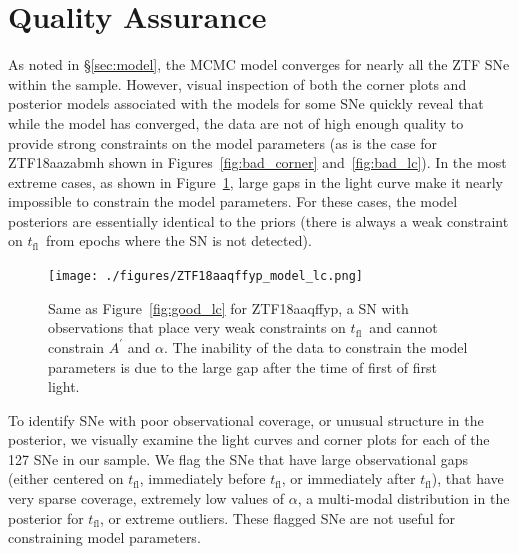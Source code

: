 \documentclass[twocolumn]{aastex63}
\newcommand{\tfl}{$t_\mathrm{fl}$}
\begin{document}

\appendix

\section{Quality Assurance \label{sec:qa}}

As noted in \S\ref{sec:model}, the MCMC model converges for nearly all the
ZTF SNe within the sample. However, visual inspection of both the corner
plots and posterior models associated with the models for some SNe quickly
reveal that while the model has converged, the data are not of high enough
quality to provide strong constraints on the model parameters (as is the case
for ZTF18aazabmh shown in Figures~\ref{fig:bad_corner} and~\ref{fig:bad_lc}).
In the most extreme cases, as shown in Figure~\ref{fig:biggap_lc}, large gaps
in the light curve make it nearly impossible to constrain the model
parameters. For these cases, the model posteriors are essentially identical
to the priors (there is always a weak constraint on \tfl\ from epochs where
the SN is not detected).

\begin{figure}
    \centering
    \texttt{[image: ./figures/ZTF18aaqffyp\_model\_lc.png]}
    \caption{Same as Figure~\ref{fig:good_lc} for ZTF18aaqffyp, a SN with observations that place very weak constraints on \tfl\ and cannot constrain $A^\prime$ and $\alpha$. The inability of the data to constrain the model parameters is due to the large gap after the time of first of first light.}
    \label{fig:biggap_lc}
\end{figure}

To identify SNe with poor observational coverage, or unusual structure in the
posterior, we visually examine the light curves and corner plots for each of
the 127 SNe in our sample. We flag the SNe that have large observational gaps
(either centered on \tfl, immediately before \tfl, or immediately after
\tfl), that have very sparse coverage, extremely low values of $\alpha$, a
multi-modal distribution in the posterior for \tfl, or extreme outliers.
These flagged SNe are not useful for constraining model parameters.
\end{document}
